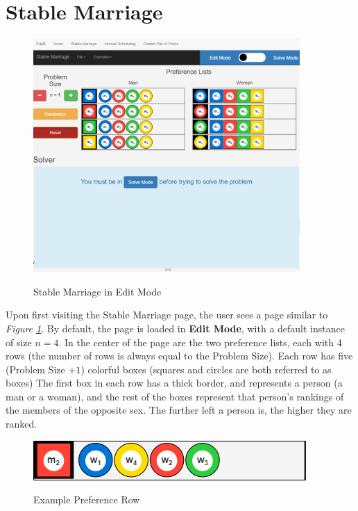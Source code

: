\section{Stable Marriage}
\begin{figure}[H]
  \caption{Stable Marriage in Edit Mode}
  \includegraphics[height=3.5in]
  {images/stable-marriage/stable-marriage-edit.png}
  \label{fig-stable-marriage-edit}
  \centering
\end{figure}
\hspace{-0.3in}
Upon first visiting the Stable Marriage page, 
the user sees a page similar to \textit{Figure \ref{fig-stable-marriage-edit}}.
By default, the page is loaded in \textbf{Edit Mode}, 
with a default instance of size $n=4$. 
\newline\newline
In the center of the page are the two preference lists, each with 4 rows 
(the number of rows is always equal to the Problem Size). 
Each row has five (Problem Size $+1$) 
colorful boxes (squares and circles are both referred to as boxes)
\newline\newline
The first box in each row has a thick border, 
and represents a person (a man or a woman), 
and the rest of the boxes represent 
that person's rankings of the members of the opposite sex.
The further left a person is, the higher they are ranked. 
\newline\newline
\begin{figure}[H]
  \caption{Example Preference Row}
  \includegraphics[]
  {images/stable-marriage/preference-row.png}
  \label{fig-preference-row}
  \centering
\end{figure}
